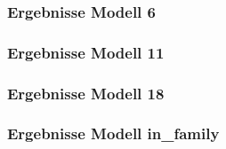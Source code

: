 \documentclass[onlymath]{beamer}
\begin{document}
\begin{frame}
	\frametitle{Ergebnisse Modell 6}
	\centering
\end{frame}


\begin{frame}
	\frametitle{Ergebnisse Modell 11}
	\centering
\end{frame}

\begin{frame}
	\frametitle{Ergebnisse Modell 18}
	\centering
\end{frame}

\begin{frame}
	\frametitle{Ergebnisse Modell in\_family}
	\centering
\end{frame}
\end{document}
